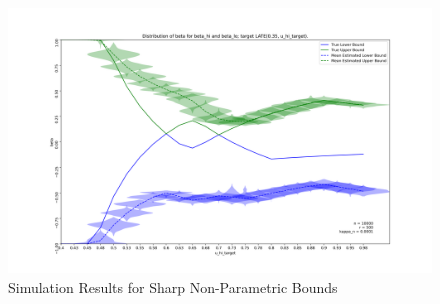 \documentclass{article}
\begin{document}
\begin{figure}
    \caption{Simulation Results for Sharp Non-Parametric Bounds \label{fig:main_sim_violin}}
    \includegraphics[width = \textwidth]{graph/simulation_sharp_bounds_10000_500_0.0001.png}
\end{figure}

\clearpage
\newpage
\end{document}
